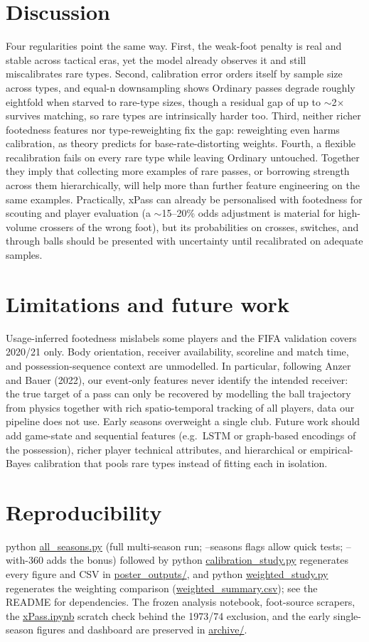 \documentclass[11pt,a4paper]{article}
\begin{document}
\section{Discussion}
Four regularities point the same way. First, the weak-foot penalty is
real and stable across tactical eras, yet the model already observes it
and still miscalibrates rare types. Second, calibration error orders
itself by sample size across types, and equal-n downsampling shows
Ordinary passes degrade roughly eightfold when starved to rare-type sizes,
though a residual gap of up to $\sim$2$\times$ survives matching, so rare
types are intrinsically harder too. Third, neither richer footedness
features nor type-reweighting fix the gap: reweighting even harms
calibration, as theory predicts for base-rate-distorting weights.
Fourth, a flexible recalibration fails on
every rare type while leaving Ordinary untouched. Together they imply
that collecting more examples of rare passes, or borrowing strength
across them hierarchically, will help more than further feature
engineering on the same examples. Practically, xPass can already be
personalised with footedness for scouting and player evaluation
(a $\sim$15--20\% odds adjustment is material for high-volume crossers of
the wrong foot), but its probabilities on crosses, switches, and
through balls should be presented with uncertainty until recalibrated on
adequate samples.

\section{Limitations and future work}
Usage-inferred footedness mislabels some players and the FIFA validation
covers 2020/21 only. Body orientation, receiver availability, scoreline
and match time, and possession-sequence context are unmodelled. In
particular, following Anzer and Bauer (2022), our event-only features never
identify the intended receiver: the true target of a pass can only be
recovered by modelling the ball trajectory from physics together with rich
spatio-temporal tracking of all players, data our pipeline does not use.
Early
seasons overweight a single club. Future work should add game-state and
sequential features (e.g.\ LSTM or graph-based encodings of the
possession), richer player technical attributes, and hierarchical or
empirical-Bayes calibration that pools rare types instead of fitting each
in isolation.

\section{Reproducibility}
python \url{all_seasons.py} (full multi-season run; --seasons
flags allow quick tests; --with-360 adds the bonus) followed by
python \url{calibration_study.py} regenerates every figure and CSV in
\url{poster_outputs/}, and python \url{weighted_study.py}
regenerates the weighting comparison (\url{weighted_summary.csv});
see the README for dependencies. The frozen
analysis notebook, foot-source scrapers, the \url{xPass.ipynb} scratch
check behind the 1973/74 exclusion, and the early single-season figures
and dashboard are preserved in \url{archive/}.
\end{document}
